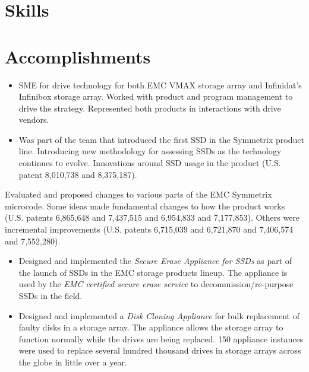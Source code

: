 \documentclass[10pt,a4paper,sans]{moderncv}
\begin{document}
\makecvtitle

\section{Skills}
\section{Accomplishments}
{\begin{itemize}
        \item {SME for drive technology for both EMC VMAX storage array and Infinidat's
        Infinibox storage array.  Worked with product and program management to drive the strategy.
    Represented both products in interactions with drive vendors.}
        \item {Was part of the team that introduced the first SSD in the Symmetrix product line. Introducing
        new methodology for assessing SSDs as the technology continues to evolve. Innovations around SSD
        usage in the product (U.S. patent 8,010,738 and 8,375,187).}
    \end{itemize}}
 {Evaluated and proposed changes to various parts of the EMC
        Symmetrix microcode.  Some ideas made fundamental changes to how the product works
	       (U.S. patents 6,865,648 and 7,437,515 and 6,954,833 and 7,177,853). Others were
           incremental improvements (U.S. patents 6,715,039 and 6,721,870 and 7,406,574 and 7,552,280).}
{\begin{itemize}
         \item {Designed and implemented the {\em Secure Erase Appliance for SSDs} as part of the launch of SSDs
         in the EMC storage products lineup. The appliance is used by the
         {\em EMC certified secure erase service} to decommission/re-purpose SSDs in the field.}
     \item  {Designed and implemented a {\em Disk Cloning Appliance} for bulk replacement of faulty
             disks in a storage array. The appliance allows the storage array to function normally while
             the drives are being replaced. 150 appliance instances were used to replace several hundred
             thousand drives in storage arrays across the globe in little over a year.}
\end{itemize}}
\end{document}
